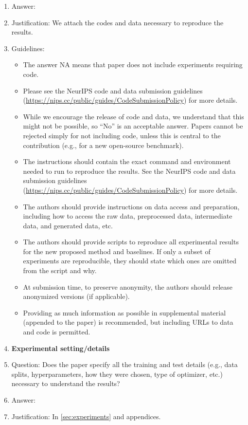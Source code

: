\documentclass{article}
\begin{document}
\begin{enumerate}
    \item[] Answer: \answerYes{}
    \item[] Justification: We attach the codes and data necessary to reproduce the results.
    \item[] Guidelines:
    \begin{itemize}
        \item The answer NA means that paper does not include experiments requiring code.
        \item Please see the NeurIPS code and data submission guidelines (\url{https://nips.cc/public/guides/CodeSubmissionPolicy}) for more details.
        \item While we encourage the release of code and data, we understand that this might not be possible, so “No” is an acceptable answer. Papers cannot be rejected simply for not including code, unless this is central to the contribution (e.g., for a new open-source benchmark).
        \item The instructions should contain the exact command and environment needed to run to reproduce the results. See the NeurIPS code and data submission guidelines (\url{https://nips.cc/public/guides/CodeSubmissionPolicy}) for more details.
        \item The authors should provide instructions on data access and preparation, including how to access the raw data, preprocessed data, intermediate data, and generated data, etc.
        \item The authors should provide scripts to reproduce all experimental results for the new proposed method and baselines. If only a subset of experiments are reproducible, they should state which ones are omitted from the script and why.
        \item At submission time, to preserve anonymity, the authors should release anonymized versions (if applicable).
        \item Providing as much information as possible in supplemental material (appended to the paper) is recommended, but including URLs to data and code is permitted.
    \end{itemize}
\item {\bf Experimental setting/details}
    \item[] Question: Does the paper specify all the training and test details (e.g., data splits, hyperparameters, how they were chosen, type of optimizer, etc.) necessary to understand the results?
    \item[] Answer: \answerYes{}
    \item[] Justification: In \cref{sec:experiments} and appendices.

\end{enumerate}
\end{document}
